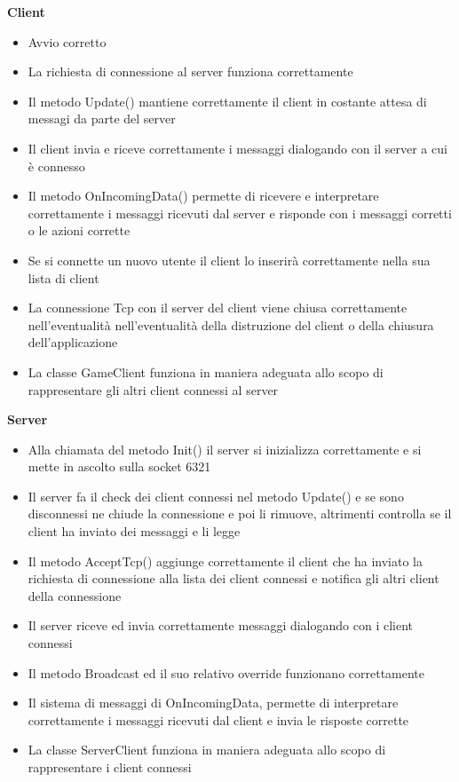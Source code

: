 \documentclass[12pt]{article}
\begin{document}
\textbf{\Large Client}
\begin{itemize}
\item Avvio corretto
\item La richiesta di connessione al server funziona correttamente
\item Il metodo Update() mantiene correttamente il client in costante attesa di messagi da parte del server
\item Il client invia e riceve correttamente i messaggi dialogando con il server a cui è connesso
\item Il metodo OnIncomingData() permette di ricevere e interpretare correttamente i messaggi ricevuti dal server e risponde con i messaggi corretti o le azioni corrette
\item Se si connette un nuovo utente il client lo inserirà correttamente nella sua lista di client
\item La connessione Tcp con il server del client viene chiusa correttamente nell'eventualità nell'eventualità della distruzione del client o della chiusura dell'applicazione
\item La classe GameClient funziona in maniera adeguata allo scopo di rappresentare gli altri client connessi al server
\end{itemize}

\textbf{\Large Server}
\begin{itemize}
\item Alla chiamata del metodo Init() il server si inizializza correttamente e si mette in ascolto sulla socket 6321
\item Il server fa il check dei client connessi nel metodo Update() e se sono disconnessi ne chiude la connessione e poi li rimuove, altrimenti controlla se il client ha inviato dei messaggi e li legge
\item Il metodo AcceptTcp() aggiunge correttamente il client che ha inviato la richiesta di connessione alla lista dei client connessi e notifica gli altri client della connessione
\item Il server riceve ed invia correttamente messaggi dialogando con i client connessi
\item Il metodo Broadcast ed il suo relativo override funzionano correttamente
\item Il sistema di messaggi di OnIncomingData, permette di interpretare correttamente i messaggi ricevuti dal client e invia le risposte corrette
\item La classe ServerClient funziona in maniera adeguata allo scopo di rappresentare i client connessi
\end{itemize}
\end{document}
